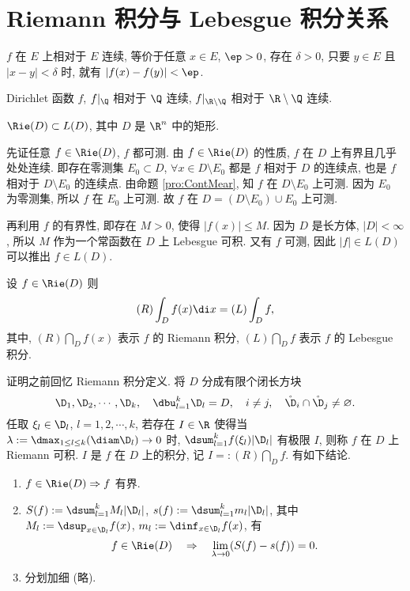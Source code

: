 \documentclass[UTF8, a4paper, 12pt, twoside, onecolumn]{book}
\begin{document}
\section{Riemann 积分与 Lebesgue 积分关系}

\begin{Definition}
	$f$ 在 $E$ 上相对于 $E$ 连续, 等价于任意 $x \in E$, $\ep > 0$, 存在 $\delta > 0$, 只要 $y \in E$ 且 $|x - y| < \delta$ 时, 就有 $|f(x) - f(y)| < \ep$.
\end{Definition}

\begin{Example}
	Dirichlet 函数 $f$, $f|_\Q$ 相对于 $\Q$ 连续, $f|_{\R\setminus\Q}$ 相对于 $\R\setminus\Q$ 连续.
\end{Example}

\begin{Theorem}
	$\Rie(D) \subset L(D)$, 其中 $D$ 是 $\R^n$ 中的矩形.
\end{Theorem}

\begin{Proof}
	先证任意 $f \in \Rie(D)$, $f$ 都可测. 由 $f \in \Rie(D)$ 的性质, $f$ 在 $D$ 上有界且几乎处处连续. 即存在零测集 $E_0 \subset D$, $\forall x \in D \setminus E_0$ 都是 $f$ 相对于 $D$ 的连续点, 也是 $f$ 相对于 $D \setminus E_0$ 的连续点. 由命题 \ref{pro:ContMear}, 知 $f$ 在 $D \setminus E_0$ 上可测. 因为 $E_0$ 为零测集, 所以 $f$ 在 $E_0$ 上可测. 故 $f$ 在 $D = (D \setminus E_0) \cup E_0$ 上可测.

	再利用 $f$ 的有界性, 即存在 $M > 0$, 使得 $|f(x)| \leq M$. 因为 $D$ 是长方体, $|D| < \infty$, 所以 $M$ 作为一个常函数在 $D$ 上 Lebesgue 可积. 又有 $f$ 可测, 因此 $|f| \in L(D)$ 可以推出 $f \in L(D)$.
\end{Proof}

\begin{Theorem}\label{thm:RieLeb}
	设 $f \in \Rie(D)$ 则
	$$(R) \int_D f(x) \di x = (L) \int_D f,$$
	其中, $(R) \dint_D f(x)$ 表示 $f$ 的 Riemann 积分, $(L) \dint_D f$ 表示 $f$ 的 Lebesgue 积分.
\end{Theorem}

证明之前回忆 Riemann 积分定义. 将 $D$ 分成有限个闭长方块
$$\D_1, \D_2, \cdots, \D_k,\quad \dbu_{l = 1}^k \D_l = D,\quad i \neq j,\quad \mathring{\D}_i \cap \mathring{\D}_j \neq \varnothing.$$
任取 $\xi_l \in \D_l$, $l = 1, 2, \cdots, k$, 若存在 $I \in \R$ 使得当 $\lambda := \dmax_{1 \leq l \leq k} (\diam \D_l) \to 0$ 时, $\dsum_{l = 1}^{k} f(\xi_l) |\D_l|$ 有极限 $I$, 则称 $f$ 在 $D$ 上 Riemann 可积. $I$ 是 $f$ 在 $D$ 上的积分, 记 $I =: (R) \dint_D f$. 有如下结论.
\begin{enumerate}
	\item $f \in \Rie(D) \Rightarrow f$ 有界.
	\item $S(f) := \dsum_{l = 1}^k M_l |\D_l|$, $s(f) := \dsum_{l = 1}^k m_l |\D_l|$, 其中 $M_l := \dsup_{x \in \D_l} f(x)$, $m_l := \dinf_{x \in \D_l} f(x)$, 有
	$$f \in \Rie(D)\quad \Rightarrow\quad \lim_{\lambda \to 0} (S(f) - s(f)) = 0.$$

	\item 分划加细 (略).
\end{enumerate}
\end{document}
